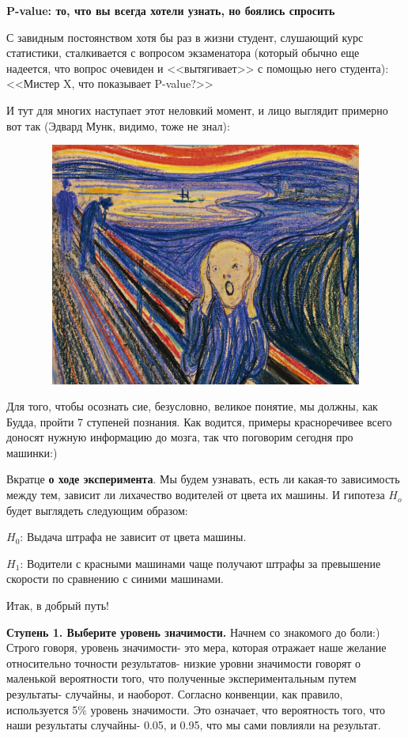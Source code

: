 \documentclass[a4paper,12pt]{article}
\begin{document}

\begin{center}
\Large {\bfseries P-value: то, что вы всегда хотели узнать, но боялись спросить}
\end{center}

С завидным постоянством хотя бы раз в жизни студент, слушающий курс статистики, сталкивается с вопросом экзаменатора (который обычно еще надеется, что вопрос очевиден и <<вытягивает>> с помощью него студента): <<Мистер X, что показывает P-value?>>

И тут для многих наступает этот неловкий момент, и лицо выглядит примерно вот так (Эдвард Мунк, видимо, тоже не знал):

\includegraphics[width=150mm,height=80mm]{munk.jpg}

Для того, чтобы осознать сие, безусловно, великое понятие, мы должны, как Будда, пройти 7 ступеней познания. Как водится, примеры красноречивее всего доносят нужную информацию до мозга, так что поговорим сегодня про машинки:)

Вкратце \textbf {о ходе эксперимента}. Мы будем узнавать, есть ли какая-то зависимость между тем, зависит ли лихачество водителей от цвета их машины. И гипотеза $H_o$ будет выглядеть следующим образом:

$H_0$: Выдача штрафа не зависит от цвета машины.

$H_1$: Водители с красными машинами чаще получают штрафы за превышение скорости по сравнению с синими машинами.


Итак, в добрый путь!

\textbf{Ступень 1. Выберите уровень значимости.} Начнем со знакомого до боли:) Строго говоря, уровень значимости- это мера, которая отражает наше желание относительно точности результатов- низкие уровни значимости говорят о маленькой вероятности того, что полученные экспериментальным путем результаты- случайны, и наоборот. Согласно конвенции, как правило, используется 5\% уровень значимости. Это означает, что вероятность того, что наши результаты случайны- 0.05, и 0.95, что мы сами повлияли на результат.
\end{document}
